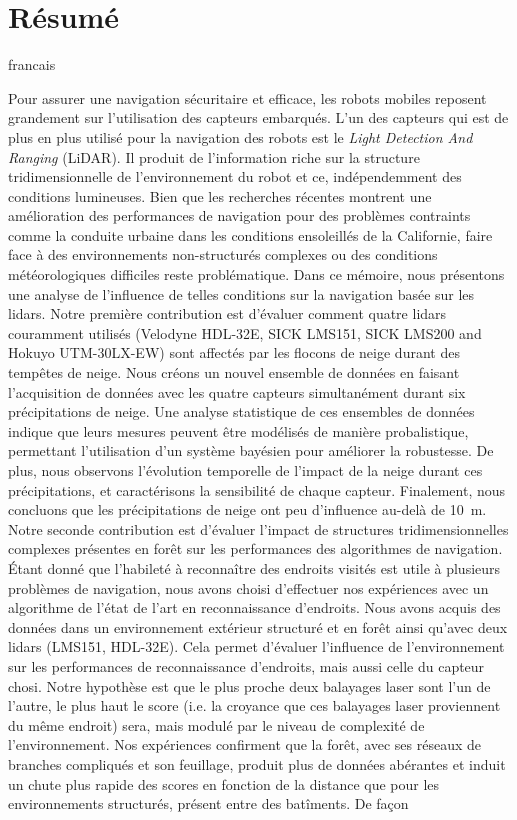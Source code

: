 \chapter*{Résumé}

\begin{otherlanguage*}{francais}

    Pour assurer une navigation sécuritaire et efficace, les robots mobiles reposent grandement sur l'utilisation des capteurs embarqués. L'un des capteurs qui est de plus en plus utilisé pour la navigation des robots est le \emph{Light Detection And Ranging} (LiDAR). Il produit de l'information riche sur la structure tridimensionnelle de l'environnement du robot et ce, indépendemment des conditions lumineuses. Bien que les recherches récentes montrent une amélioration des performances de navigation pour des problèmes contraints comme la conduite urbaine dans les conditions ensoleillés de la Californie, faire face à des environnements non-structurés complexes ou des conditions météorologiques difficiles reste problématique. Dans ce mémoire, nous présentons une analyse de l'influence de telles conditions sur la navigation basée sur les \gls*{lidar}s. Notre première contribution est d'évaluer comment quatre \gls*{lidar}s couramment utilisés (Velodyne HDL-32E, SICK LMS151, SICK LMS200 and Hokuyo UTM-30LX-EW) sont affectés par les flocons de neige durant des tempêtes de neige. Nous créons un nouvel ensemble de données en faisant l'acquisition de données avec les quatre capteurs simultanément durant six précipitations de neige. Une analyse statistique de ces ensembles de données indique que leurs mesures peuvent être modélisés de manière probalistique, permettant l'utilisation d'un système bayésien pour améliorer la robustesse. De plus, nous observons l'évolution temporelle de l'impact de la neige durant ces précipitations, et caractérisons la sensibilité de chaque capteur. Finalement, nous concluons que les précipitations de neige ont peu d'influence au-delà de \SI{10}{\meter}. Notre seconde contribution est d'évaluer l'impact de structures tridimensionnelles complexes présentes en forêt sur les performances des algorithmes de navigation. Étant donné que l'habileté à reconnaître des endroits visités est utile à plusieurs problèmes de navigation, nous avons choisi d'effectuer nos expériences avec un algorithme de l'état de l'art en reconnaissance d'endroits. Nous avons acquis des données dans un environnement extérieur structuré et en forêt ainsi qu'avec deux \gls*{lidar}s (LMS151, HDL-32E). Cela permet d'évaluer l'influence de l'environnement sur les performances de reconnaissance d'endroits, mais aussi celle du capteur chosi. Notre hypothèse est que le plus proche deux balayages laser sont l'un de l'autre, le plus haut le score (i.e. la croyance que ces balayages laser proviennent du même endroit) sera, mais modulé par le niveau de complexité de l'environnement. Nos expériences confirment que la forêt, avec ses réseaux de branches compliqués et son feuillage, produit plus de données abérantes et induit un chute plus rapide des scores en fonction de la distance que pour les environnements structurés, présent entre des batîments. De façon 
\end{otherlanguage*}
